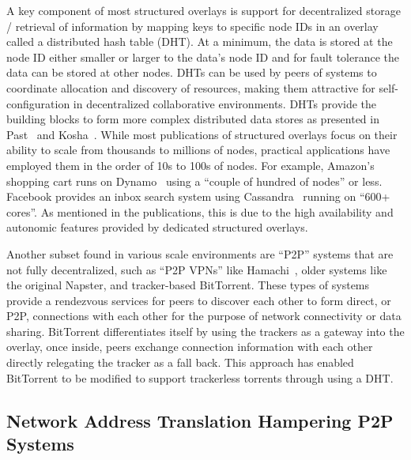 \documentclass[conference]{IEEEtran}
\begin{document}
A key component of most structured overlays is support for decentralized
storage / retrieval of information by mapping keys to specific node IDs in an
overlay called a distributed hash table (DHT).  At a minimum, the data is
stored at the node ID either smaller or larger to the data's node ID and for
fault tolerance the data can be stored at other nodes.  DHTs can be used by
peers of systems to coordinate allocation and discovery of resources, making
them attractive for self-configuration in decentralized collaborative
environments.  DHTs provide the building blocks to form more complex
distributed data stores as presented in Past~\cite{past} and
Kosha~\cite{kosha}.  While most publications of structured overlays focus on
their ability to scale from thousands to millions of nodes, practical
applications have employed them in the order of 10s to 100s of nodes.  For
example, Amazon's shopping cart runs on Dynamo~\cite{dynamo} using a ``couple
of hundred of nodes'' or less.  Facebook provides an inbox search system using
Cassandra~\cite{cassandra} running on ``600+ cores''.  As mentioned in the
publications, this is due to the high availability and autonomic features
provided by dedicated structured overlays.

Another subset found in various scale environments are ``P2P'' systems that are
not fully decentralized, such as ``P2P VPNs'' like Hamachi~\cite{hamachi},
older systems like the original Napster, and tracker-based BitTorrent.  These
types of systems provide a rendezvous services for peers to discover each other
to form direct, or P2P, connections with each other for the purpose of network
connectivity or data sharing.  BitTorrent differentiates itself by using the
trackers as a gateway into the overlay, once inside, peers exchange connection
information with each other directly relegating the tracker as a fall back.
This approach has enabled BitTorrent to be modified to support trackerless
torrents through using a DHT.

\subsection{Network Address Translation Hampering P2P Systems}
\end{document}
